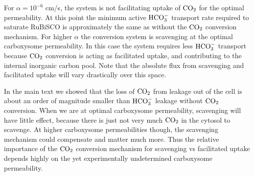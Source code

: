 \documentclass[]{article}
\begin{document}
For $\alpha = 10^{-6}$ cm/s, the system is not facilitating uptake of ${\rm CO_2}$ for the optimal permeability. At this point the minimum active ${\rm HCO_3^-}$ transport rate required to saturate RuBiSCO is approximately the same as without the ${\rm CO_2}$ conversion mechanism. For higher ${\alpha}$ the conversion system is scavenging at the optimal carboxysome permeability. In this case the system requires less ${\rm HCO_3^-}$ transport because ${\rm CO_2}$ conversion is acting as facilitated uptake, and contributing to the internal inorganic carbon pool. Note that the absolute flux from scavenging and facilitated uptake will vary drastically over this space. 

In the main text we showed that the loss of ${\rm CO_2}$ from leakage out of the cell is about an order of magnitude smaller than ${\rm HCO_3^-}$ leakage without ${\rm CO_2}$ conversion. When we are at optimal carboxysome permeability, scavenging will have little effect, because there is just not very much ${\rm CO_2}$ in the cytosol to scavenge. At higher carboxysome permeabilities though, the scavenging mechanism could compensate and matter much more. Thus the relative importance of the ${\rm CO_2}$ conversion mechanism for scavenging vs facilitated uptake depends highly on the yet experimentally undetermined carboxysome permeability.

\end{document}
